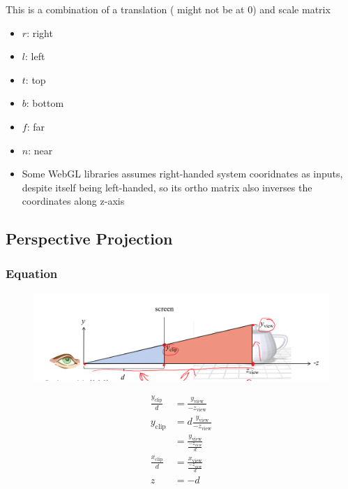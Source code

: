     This is a combination of a translation ( might not be at 0)
    and scale matrix

    \begin{itemize}
      \item $ r $: right
      \item $ l $: left
      \item $ t $: top
      \item $ b $: bottom
      \item $ f $: far
      \item $ n $: near
      \item Some WebGL libraries assumes right-handed system cooridnates as
      inputs, despite itself being left-handed, so its ortho matrix also
      inverses the coordinates along z-axis
    \end{itemize}

  \subsection{Perspective Projection}

    \subsubsection{Equation}

      \begin{figure}[H]
        \centering
        \includegraphics[width=0.7\columnwidth]{images/pipelines/perspective-equation.png}
      \end{figure}

      \begin{align}
        \frac{y_{\text{clip}}}{d}
        &= \frac{y_{\text{view}}}{-z_{\text{view}}} \\
        y_{\text{clip}}
        &= d\frac{y_ {\text{view}}}{-z_{\text{view}}} \\
        &= \frac{y_{\text{view}}}{\frac{-z_{\text{view}}}{d}} \\
        \frac{x_{\text{clip}}}{d}
        &= \frac{x_{\text{view}}}{\frac{-z_{\text{view}}}{d}} \\
        z &= -d
      \end{align}

